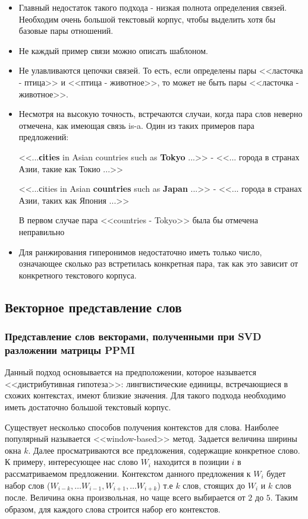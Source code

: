 \begin{itemize}
\item Главный недостаток такого подхода - низкая полнота определения связей. Необходим
очень большой текстовый корпус, чтобы выделить хотя бы базовые пары отношений.

\item Не каждый пример связи можно описать шаблоном.

\item Не улавливаются цепочки связей. То есть, если определены пары <<ласточка - птица>> и
<<птица - животное>>, то может не быть пары <<ласточка - животное>>.
\item Несмотря на высокую точность, встречаются случаи, когда пара слов неверно отмечена,
как имеющая связь is-a. Один из таких примеров пара предложений:

<<...\textbf{сities} in Asian countries such as \textbf{Tokyo} ...>> - <<... города в странах Азии, такие как Токио
...>>

<<...сities in Asian \textbf{countries} such as \textbf{Japan} ...>> - <<... города в странах Азии, таких как
Япония ...>>

В первом случае пара <<countries - Tokyo>> была бы отмечена неправильно

\item Для ранжирования гиперонимов недостаточно иметь только число, означающее сколько
раз встретилась конкретная пара, так как это зависит от конкретного текстового
корпуса.
\end{itemize}

\subsection{Векторное представление слов}

\subsubsection{Представление слов векторами, полученными при SVD разложении матрицы PPMI}

Данный подход основывается на предположении, которое называется
<<дистрибутивная гипотеза>>: лингвистические единицы, встречающиеся в схожих
контекстах, имеют близкие значения. Для такого подхода необходимо иметь достаточно
большой текстовый корпус.

Существует несколько способов получения контекстов для слова. Наиболее популярный
называется <<window-based>> метод. Задается величина ширины окна $k$. Далее
просматриваются все предложения, содержащие конкретное слово. К примеру,
интересующее нас слово $W_i$ находится в позиции $i$ в рассматриваемом предложении.
Контекстом данного предложения к $W_i$ будет набор слов ($W_{i-k}, \ldots W_{i-1}, W_{i+1}, \ldots W_{i+k}$) т.е $k$
слов, стоящих до $W_i$ и $k$ слов после. Величина окна произвольная, но чаще всего
выбирается от $2$ до $5$. Таким образом, для каждого слова строится набор его контекстов.

